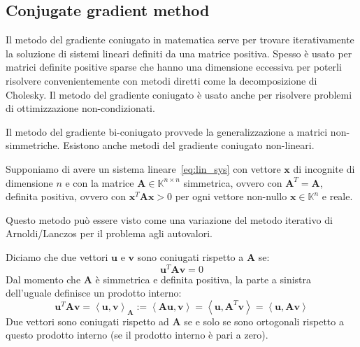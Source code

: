 \documentclass[10pt]{article}
\begin{document}
\subsection{Conjugate gradient method}

Il metodo del gradiente coniugato in matematica serve per trovare iterativamente la soluzione di sistemi lineari definiti da una matrice positiva.
Spesso è usato per matrici definite positive sparse che hanno una dimensione eccessiva per poterli risolvere convenientemente con metodi diretti come la decomposizione di Cholesky.
Il metodo del gradiente coniugato è usato anche per risolvere problemi di ottimizzazione non-condizionati.

Il metodo del gradiente bi-coniugato provvede la generalizzazione a matrici non-simmetriche.
Esistono anche metodi del gradiente coniugato non-lineari.

Supponiamo di avere un sistema lineare~\eqref{eq:lin_sys} con vettore $\mathbf{x}$ di incognite di dimensione $n$ e con la matrice $\mathbf{A} \in \mathbb{K}^{n\times n}$ simmetrica, ovvero con $\mathbf{A}^T=\mathbf{A}$, definita positiva, ovvero con $\mathbf{x}^T\mathbf{A}\mathbf{x}>0$ per ogni vettore non-nullo $\mathbf{x}\in\mathbb{K}^n$ e reale.

Questo metodo può essere visto come una variazione del metodo iterativo di Arnoldi/Lanczos per il problema agli autovalori.

Diciamo che due vettori $\mathbf{u}$ e $\mathbf{v}$ sono coniugati rispetto a $\mathbf{A}$ se:
\begin{equation}
\mathbf{u}^T \mathbf{A} \mathbf{v} = 0
\end{equation}
Dal momento che $\mathbf{A}$ è simmetrica e definita positiva, la parte a sinistra dell'uguale definisce un prodotto interno:
\begin{equation}
\mathbf{u}^T\mathbf{A}\mathbf{v} = \left<\mathbf{u},\mathbf{v}\right>_\mathbf{A} :=
\left<\mathbf{Au},\mathbf{v}\right> = \left<\mathbf{u},\mathbf{A}^T\mathbf{v}\right> = \left<\mathbf{u}, \mathbf{Av}\right>
\end{equation}
Due vettori sono coniugati rispetto ad $\mathbf{A}$ se e solo se sono ortogonali rispetto a questo prodotto interno (se il prodotto interno è pari a zero).
\end{document}
